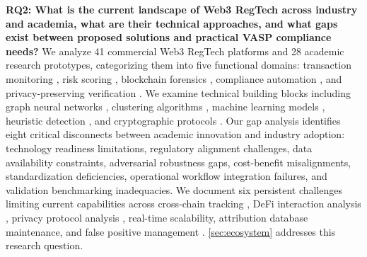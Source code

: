 \noindent\textbf{RQ2: What is the current landscape of Web3 RegTech across industry and academia, what are their technical approaches, and what gaps exist between proposed solutions and practical VASP compliance needs?}
We analyze 41 commercial Web3 RegTech platforms and 28 academic research prototypes, categorizing them into five functional domains: transaction monitoring \cite{weber2019antimoneylaunderingbitcoin,petterssonruiz2022combatingmoneylaundering}, risk scoring \cite{moser2014riskscoringbitcoin,monamo2016unsupervisedlearningrobust}, blockchain forensics \cite{meiklejohn2013fistfulbitcoinscharacterizing,yousaf2019tracingtransactionscryptocurrency}, compliance automation \cite{charoenwong2024regtechtechnologydrivencompliance}, and privacy-preserving verification \cite{ben-sasson2017scalablezeroknowledge,yang2024researchidentitydata}. We examine technical building blocks including graph neural networks \cite{wu2023tracerscalablegraphbased,azad2025machinelearningblockchain,asiri2025graphconvolutionnetwork,zhang2024graphnetworkmodels}, clustering algorithms \cite{reid2013analysisanonymitybitcoin,ron2013quantitativeanalysisfull}, machine learning models \cite{pourhabibi2020frauddetectionsystematic,rodriguezvalencia2025systematicreviewartificial}, heuristic detection \cite{difrancescomaesa2018datadrivenanalysisbitcoin}, and cryptographic protocols \cite{zhang2024blockchainzeroknowledge,camenisch2001efficientsystemnontransferable}. Our gap analysis identifies eight critical disconnects between academic innovation and industry adoption: technology readiness limitations, regulatory alignment challenges, data availability constraints, adversarial robustness gaps, cost-benefit misalignments, standardization deficiencies, operational workflow integration failures, and validation benchmarking inadequacies. We document six persistent challenges limiting current capabilities across cross-chain tracking \cite{zamyatin2021sokcommunicationdistributed,lin2024crosschainabnormaltransaction}, DeFi interaction analysis \cite{qin2021attackingdefiecosystem,sun2025ethereumfrauddetection}, privacy protocol analysis \cite{kappos2018empiricalanalysisanonymity,kumar2017traceabilityanalysismoneros}, real-time scalability, attribution database maintenance, and false positive management \cite{alotibi2022moneylaunderingdetection}. \autoref{sec:ecosystem} addresses this research question.

